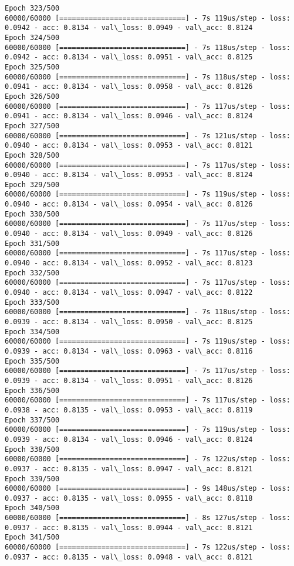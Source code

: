 \documentclass[11pt]{article}
\begin{document}
\begin{Verbatim}[commandchars=\\\{\}]
Epoch 323/500
60000/60000 [==============================] - 7s 119us/step - loss: 0.0942 - acc: 0.8134 - val\_loss: 0.0949 - val\_acc: 0.8124
Epoch 324/500
60000/60000 [==============================] - 7s 118us/step - loss: 0.0942 - acc: 0.8134 - val\_loss: 0.0951 - val\_acc: 0.8125
Epoch 325/500
60000/60000 [==============================] - 7s 118us/step - loss: 0.0941 - acc: 0.8134 - val\_loss: 0.0958 - val\_acc: 0.8126
Epoch 326/500
60000/60000 [==============================] - 7s 117us/step - loss: 0.0941 - acc: 0.8134 - val\_loss: 0.0946 - val\_acc: 0.8124
Epoch 327/500
60000/60000 [==============================] - 7s 121us/step - loss: 0.0940 - acc: 0.8134 - val\_loss: 0.0953 - val\_acc: 0.8121
Epoch 328/500
60000/60000 [==============================] - 7s 117us/step - loss: 0.0940 - acc: 0.8134 - val\_loss: 0.0953 - val\_acc: 0.8124
Epoch 329/500
60000/60000 [==============================] - 7s 119us/step - loss: 0.0940 - acc: 0.8134 - val\_loss: 0.0954 - val\_acc: 0.8126
Epoch 330/500
60000/60000 [==============================] - 7s 117us/step - loss: 0.0940 - acc: 0.8134 - val\_loss: 0.0949 - val\_acc: 0.8126
Epoch 331/500
60000/60000 [==============================] - 7s 117us/step - loss: 0.0940 - acc: 0.8134 - val\_loss: 0.0952 - val\_acc: 0.8123
Epoch 332/500
60000/60000 [==============================] - 7s 117us/step - loss: 0.0940 - acc: 0.8134 - val\_loss: 0.0947 - val\_acc: 0.8122
Epoch 333/500
60000/60000 [==============================] - 7s 118us/step - loss: 0.0939 - acc: 0.8134 - val\_loss: 0.0950 - val\_acc: 0.8125
Epoch 334/500
60000/60000 [==============================] - 7s 119us/step - loss: 0.0939 - acc: 0.8134 - val\_loss: 0.0963 - val\_acc: 0.8116
Epoch 335/500
60000/60000 [==============================] - 7s 117us/step - loss: 0.0939 - acc: 0.8134 - val\_loss: 0.0951 - val\_acc: 0.8126
Epoch 336/500
60000/60000 [==============================] - 7s 117us/step - loss: 0.0938 - acc: 0.8135 - val\_loss: 0.0953 - val\_acc: 0.8119
Epoch 337/500
60000/60000 [==============================] - 7s 119us/step - loss: 0.0939 - acc: 0.8134 - val\_loss: 0.0946 - val\_acc: 0.8124
Epoch 338/500
60000/60000 [==============================] - 7s 122us/step - loss: 0.0937 - acc: 0.8135 - val\_loss: 0.0947 - val\_acc: 0.8121
Epoch 339/500
60000/60000 [==============================] - 9s 148us/step - loss: 0.0937 - acc: 0.8135 - val\_loss: 0.0955 - val\_acc: 0.8118
Epoch 340/500
60000/60000 [==============================] - 8s 127us/step - loss: 0.0937 - acc: 0.8135 - val\_loss: 0.0944 - val\_acc: 0.8121
Epoch 341/500
60000/60000 [==============================] - 7s 122us/step - loss: 0.0937 - acc: 0.8135 - val\_loss: 0.0948 - val\_acc: 0.8121

\end{Verbatim}
\end{document}
